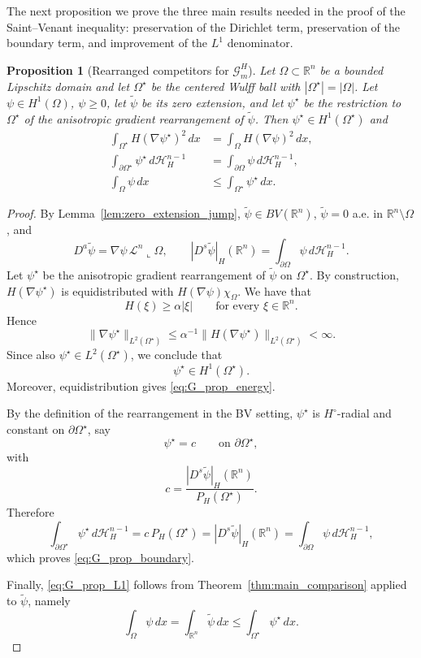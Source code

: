 \documentclass[oneside,a4paper,12pt,notitlepage]{article}
\newtheorem{proposition}[theorem]{Proposition}
\theoremstyle{definition}
\newcommand{\R}{\mathbb{R}}
\begin{document}
\medskip

The next proposition we prove the three main results  needed in the proof of the
Saint--Venant inequality: preservation of the Dirichlet term, preservation of the
boundary term, and improvement of the $L^1$ denominator.

\begin{proposition}[Rearranged competitors for $\mathcal G_m^H$]
\label{prop:rearranged_competitor_G}
Let $\Omega\subset\R^n$ be a bounded Lipschitz domain and let $\Omega^\star$ be the
centered Wulff ball with $|\Omega^\star|=|\Omega|$. Let $\psi\in H^1(\Omega)$, $\psi\ge 0$,
let $\tilde\psi$ be its zero extension, and let $\psi^\star$ be the restriction to
$\Omega^\star$ of the anisotropic gradient rearrangement of $\tilde\psi$.
Then $\psi^\star\in H^1(\Omega^\star)$ and
\begin{align}
\int_{\Omega^\star} H(\nabla\psi^\star)^2\,dx
&=
\int_\Omega H(\nabla\psi)^2\,dx,
\label{eq:G_prop_energy}
\\[1mm]
\int_{\partial\Omega^\star}\psi^\star\,d\mathcal H_H^{n-1}
&=
\int_{\partial\Omega}\psi\,d\mathcal H_H^{n-1},
\label{eq:G_prop_boundary}
\\[1mm]
\int_\Omega \psi\,dx
&\le
\int_{\Omega^\star}\psi^\star\,dx.
\label{eq:G_prop_L1}
\end{align}
\end{proposition}

\begin{proof}
By Lemma~\ref{lem:zero_extension_jump}, $\tilde\psi\in BV(\R^n)$, $\tilde\psi=0$ a.e. in
$\R^n\setminus\Omega$, and
\[
D^a\tilde\psi=\nabla\psi\,\mathcal L^n\llcorner\Omega,
\qquad
|D^s\tilde\psi|_H(\R^n)=\int_{\partial\Omega}\psi\,d\mathcal H_H^{n-1}.
\]
Let $\psi^\star$ be the anisotropic gradient rearrangement of $\tilde\psi$ on $\Omega^\star$.
By construction, $H(\nabla\psi^\star)$ is equidistributed with
$H(\nabla\psi)\chi_\Omega$. 
We have that 
\[
H(\xi)\ge \alpha|\xi|
\qquad\text{for every }\xi\in\R^n .
\]
Hence
\[
\|\nabla\psi^\star\|_{L^2(\Omega^\star)}
\le \alpha^{-1}\|H(\nabla\psi^\star)\|_{L^2(\Omega^\star)}<\infty.
\]
Since also \(\psi^\star\in L^2(\Omega^\star)\), we conclude that
\[
\psi^\star\in H^1(\Omega^\star).
\]
Moreover, equidistribution gives \eqref{eq:G_prop_energy}.

By the definition of the rearrangement in the BV setting, $\psi^\star$ is
$H^\circ$-radial and constant on $\partial\Omega^\star$, say
\[
\psi^\star=c
\qquad \text{on }\partial\Omega^\star,
\]
with
\[
c=\frac{|D^s\tilde\psi|_H(\R^n)}{P_H(\Omega^\star)}.
\]
Therefore
\[
\int_{\partial\Omega^\star}\psi^\star\,d\mathcal H_H^{n-1}
=
c\,P_H(\Omega^\star)
=
|D^s\tilde\psi|_H(\R^n)
=
\int_{\partial\Omega}\psi\,d\mathcal H_H^{n-1},
\]
which proves \eqref{eq:G_prop_boundary}.

Finally, \eqref{eq:G_prop_L1} follows from Theorem~\ref{thm:main_comparison} applied to
$\tilde\psi$, namely
\[
\int_\Omega \psi\,dx
=
\int_{\R^n}\tilde\psi\,dx
\le
\int_{\Omega^\star}\psi^\star\,dx.
\]
\end{proof}
\end{document}
